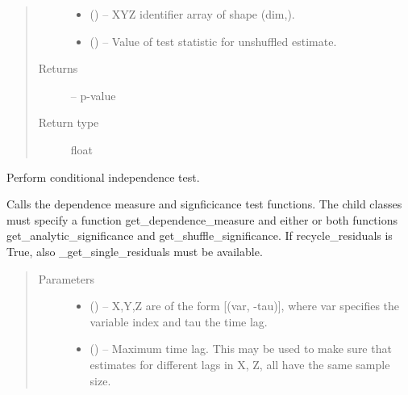 \documentclass[letterpaper,10pt,english]{sphinxmanual}
\begin{document}
\begin{fulllineitems}
\begin{fulllineitems}
\begin{quote}
\begin{description}
\begin{itemize}
\item {} 
 () -- XYZ identifier array of shape (dim,).

\item {} 
 () -- Value of test statistic for unshuffled estimate.

\end{itemize}

\item[{Returns}] \leavevmode
{} -- p-value

\item[{Return type}] \leavevmode
float

\end{description}\end{quote}

\end{fulllineitems}


\begin{fulllineitems}
\label{\detokenize{index:tigramite.independence_tests.CondIndTest.run_test}}
Perform conditional independence test.

Calls the dependence measure and signficicance test functions. The child
classes must specify a function get\_dependence\_measure and either or
both functions get\_analytic\_significance and  get\_shuffle\_significance.
If recycle\_residuals is True, also  \_get\_single\_residuals must be
available.
\begin{quote}\begin{description}
\item[{Parameters}] \leavevmode\begin{itemize}
\item {} 
\sphinxstyleliteralstrong{, } (\sphinxstyleliteralemphasis{,}\sphinxstyleliteralemphasis{}) -- X,Y,Z are of the form {[}(var, -tau){]}, where var specifies the
variable index and tau the time lag.

\item {} 
 (\sphinxstyleliteralemphasis{, }\sphinxstyleliteralemphasis{ (}\sphinxstyleliteralemphasis{)}\sphinxstyleliteralemphasis{}) -- Maximum time lag. This may be used to make sure that estimates for
different lags in X, Z, all have the same sample size.


\end{itemize}
\end{description}
\end{quote}
\end{fulllineitems}
\end{fulllineitems}
\end{document}
